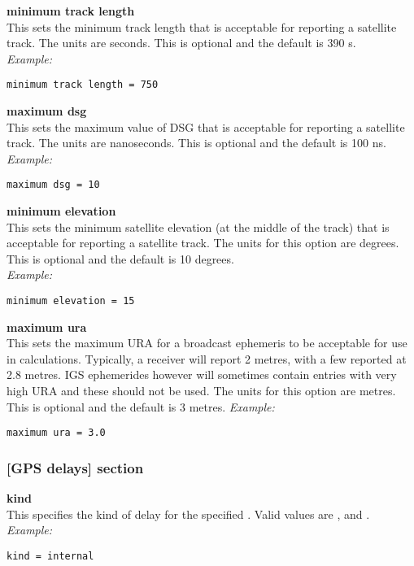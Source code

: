 {\bfseries minimum track length}\\
This sets the minimum track length that is acceptable for reporting a satellite track.
The units are seconds.
This is optional and the default is 390 s.\\
\textit{Example:}
\begin{lstlisting}
minimum track length = 750
\end{lstlisting}

{\bfseries maximum dsg}\\
This sets the maximum value of DSG that is acceptable for reporting a satellite track.
The units are nanoseconds.
This is optional and the default is 100 ns.\\
\textit{Example:}
\begin{lstlisting}
maximum dsg = 10
\end{lstlisting}

{\bfseries minimum elevation}\\
This sets the minimum satellite elevation (at the middle of the track) that is acceptable for reporting a satellite track.
The units for this option are degrees.
This is optional and the default is 10 degrees.\\
\textit{Example:}
\begin{lstlisting}
minimum elevation = 15
\end{lstlisting}

{\bfseries maximum ura}\\
This sets the maximum URA for a broadcast ephemeris to be acceptable for use in calculations.
Typically, a receiver will report 2 metres, with a few reported at 2.8 metres.
IGS ephemerides however  will sometimes contain entries with very high URA and these should not be used.
The units for this option are metres.
This is optional and the default is 3 metres.
\textit{Example:}
\begin{lstlisting}
maximum ura = 3.0
\end{lstlisting}
	
\subsubsection{[GPS delays] section }


{\bfseries kind}\\
This specifies the kind of delay for the specified . Valid values are , and .\\
\textit{Example:}
\begin{lstlisting}
kind = internal
\end{lstlisting}

